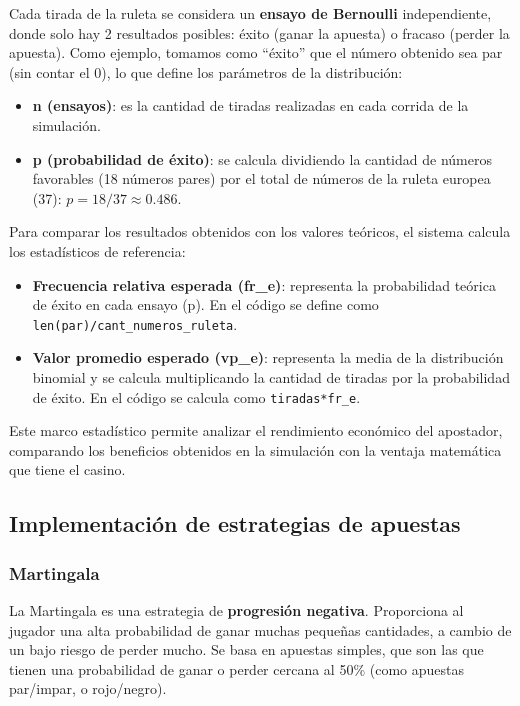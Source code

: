 \documentclass{article}
\begin{document}
Cada tirada de la ruleta se considera un \textbf{ensayo de Bernoulli} independiente, donde solo hay 2 resultados posibles: éxito (ganar la apuesta) o fracaso (perder la apuesta). Como ejemplo, tomamos como “éxito” que el número obtenido sea par (sin contar el 0), lo que define los parámetros de la distribución:

\begin{itemize}
  \item \textbf{n (ensayos)}: es la cantidad de tiradas realizadas en cada corrida de la simulación.
  \item \textbf{p (probabilidad de éxito)}: se calcula dividiendo la cantidad de números favorables (18 números pares) por el total de números de la ruleta europea (37): $p = 18/37 \approx 0.486$.
\end{itemize}

Para comparar los resultados obtenidos con los valores teóricos, el sistema calcula los estadísticos de referencia:

\begin{itemize}
  \item \textbf{Frecuencia relativa esperada (fr\_e)}: representa la probabilidad teórica de éxito en cada ensayo (p). En el código se define como \texttt{len(par)/cant\_numeros\_ruleta}.
  \item \textbf{Valor promedio esperado (vp\_e)}: representa la media de la distribución binomial y se calcula multiplicando la cantidad de tiradas por la probabilidad de éxito. En el código se calcula como \texttt{tiradas*fr\_e}.
\end{itemize}

Este marco estadístico permite analizar el rendimiento económico del apostador, comparando los beneficios obtenidos en la simulación con la ventaja matemática que tiene el casino.




\subsection{Implementación de estrategias de apuestas}



\subsubsection{Martingala}
La Martingala es una estrategia de \textbf{progresión negativa}. Proporciona al jugador una alta probabilidad de ganar muchas pequeñas cantidades, a cambio de un bajo riesgo de perder mucho. Se basa en apuestas simples, que son las que tienen una probabilidad de ganar o perder cercana al 50\% (como apuestas par/impar, o rojo/negro).
\end{document}
